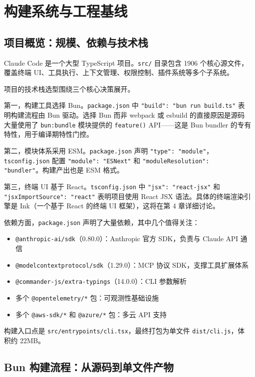 \chapter{构建系统与工程基线}

\section{项目概览：规模、依赖与技术栈}

Claude Code 是一个大型 TypeScript 项目。\texttt{src/} 目录包含 1906 个核心源文件，覆盖终端 UI、工具执行、上下文管理、权限控制、插件系统等多个子系统。

项目的技术栈选型围绕三个核心决策展开。

第一，构建工具选择 Bun。\texttt{package.json} 中 \texttt{"build": "bun run build.ts"} 表明构建流程由 Bun 驱动。选择 Bun 而非 webpack 或 esbuild 的直接原因是源码大量使用了 \texttt{bun:bundle} 模块提供的 \texttt{feature()} API——这是 Bun bundler 的专有特性，用于编译期特性门控。

第二，模块体系采用 ESM。\texttt{package.json} 声明 \texttt{"type": "module"}，\texttt{tsconfig.json} 配置 \texttt{"module": "ESNext"} 和 \texttt{"moduleResolution": "bundler"}。构建产出也是 ESM 格式。

第三，终端 UI 基于 React。\texttt{tsconfig.json} 中 \texttt{"jsx": "react-jsx"} 和 \texttt{"jsxImportSource": "react"} 表明项目使用 React JSX 语法。具体的终端渲染引擎是 Ink（一个基于 React 的终端 UI 框架），这将在第 4 章详细讨论。

依赖方面，\texttt{package.json} 声明了大量依赖，其中几个值得关注：

\begin{itemize}
  \item \texttt{@anthropic-ai/sdk}（0.80.0）：Anthropic 官方 SDK，负责与 Claude API 通信
  \item \texttt{@modelcontextprotocol/sdk}（1.29.0）：MCP 协议 SDK，支撑工具扩展体系
  \item \texttt{@commander-js/extra-typings}（14.0.0）：CLI 参数解析
  \item 多个 \texttt{@opentelemetry/*} 包：可观测性基础设施
  \item 多个 \texttt{@aws-sdk/*} 和 \texttt{@azure/*} 包：多云 API 支持
\end{itemize}

构建入口点是 \texttt{src/entrypoints/cli.tsx}，最终打包为单文件 \texttt{dist/cli.js}，体积约 22MB。

\section{Bun 构建流程：从源码到单文件产物}

